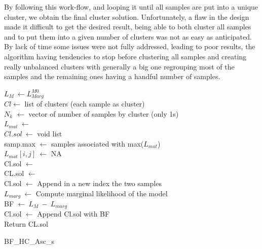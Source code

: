\documentclass[twocolumn,12pt]{article}
\begin{document}
By following this work-flow, and looping it until all samples are put into a unique cluster, we obtain the final cluster solution.
Unfortunately, a flaw in the design made it difficult to get the desired result, being able to both cluster all samples and to put them into a given number of clusters was not as easy as anticipated.
By lack of time some issues were not fully addressed, leading to poor results, the algorithm having tendencies to stop before clustering all samples and creating really unbalanced clusters with generally a big one regrouping most of the samples and the remaining ones having a handful number of samples.
\begin{algorithm}[!]
 \BlankLine
 $L_M\ \leftarrow L_{Marg}^{M0}$\\
 $Cl \leftarrow$ list of clusters (each sample as cluster)\\
 $N_k$ $\leftarrow$ vector of number of samples by cluster (only 1s)\\
 $L_{mat}\ \leftarrow$ \\
 $Cl.sol\ \leftarrow$ void list\\
 \BlankLine
    {
       samp.max $\leftarrow$ samples associated with max($L_{mat}$)\\
       $L_{mat}[i,j]\ \leftarrow$ NA\\
       {
        Cl.sol $\leftarrow$ \\
       }
       {
        CL.sol $\leftarrow$ \\
       }
       \Else
       {
        Cl.sol $\leftarrow$ Append in a new index the two samples\\
       }
    }
    $L_{marg}\ \leftarrow$ Compute marginal likelihood of the model\\
    BF $\leftarrow\ L_M\ -\ L_{marg}$\\
    Cl.sol $\leftarrow$ Append Cl.sol with BF\\
    Return CL.sol
 \caption{BF\_HC\_Asc\_s}
\end{algorithm}
\end{document}

